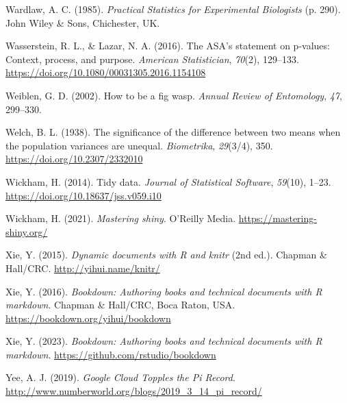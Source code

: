 \documentclass[
  openany]{krantz}
\newlength{\cslhangindent}
\newlength{\cslentryspacingunit} %
\newenvironment{CSLReferences}[2] %
 {%
  \setlength{\parindent}{0pt}
  \ifodd #1
  \let\oldpar\par
  \def\par{\hangindent=\cslhangindent\oldpar}
  \fi
  \setlength{\parskip}{#2\cslentryspacingunit}
 }%
 {}
\begin{document}
\begin{CSLReferences}{1}{0}
\leavevmode{}%
Wardlaw, A. C. (1985). \emph{{Practical Statistics for Experimental Biologists}} (p. 290). John Wiley \& Sons, Chichester, UK.

\leavevmode{}%
Wasserstein, R. L., \& Lazar, N. A. (2016). The ASA's statement on p-values: Context, process, and purpose. \emph{American Statistician}, \emph{70}(2), 129--133. \url{https://doi.org/10.1080/00031305.2016.1154108}

\leavevmode{}%
Weiblen, G. D. (2002). {How to be a fig wasp}. \emph{Annual Review of Entomology}, \emph{47}, 299--330.

\leavevmode{}%
Welch, B. L. (1938). The significance of the difference between two means when the population variances are unequal. \emph{Biometrika}, \emph{29}(3/4), 350. \url{https://doi.org/10.2307/2332010}

\leavevmode{}%
Wickham, H. (2014). {Tidy data}. \emph{Journal of Statistical Software}, \emph{59}(10), 1--23. \url{https://doi.org/10.18637/jss.v059.i10}

\leavevmode{}%
Wickham, H. (2021). \emph{Mastering shiny}. O'Reilly Media. \url{https://mastering-shiny.org/}

\leavevmode{}%
Xie, Y. (2015). \emph{Dynamic documents with {R} and knitr} (2nd ed.). Chapman \& Hall/CRC. \url{http://yihui.name/knitr/}

\leavevmode{}%
Xie, Y. (2016). \emph{Bookdown: Authoring books and technical documents with {R} markdown}. Chapman \& Hall/CRC, Boca Raton, USA. \url{https://bookdown.org/yihui/bookdown}

\leavevmode{}%
Xie, Y. (2023). \emph{Bookdown: Authoring books and technical documents with {R} markdown}. \url{https://github.com/rstudio/bookdown}

\leavevmode{}%
Yee, A. J. (2019). \emph{{Google Cloud Topples the Pi Record}}. \url{http://www.numberworld.org/blogs/2019_3_14_pi_record/}

\end{CSLReferences}

\backmatter
\printindex
\end{document}
